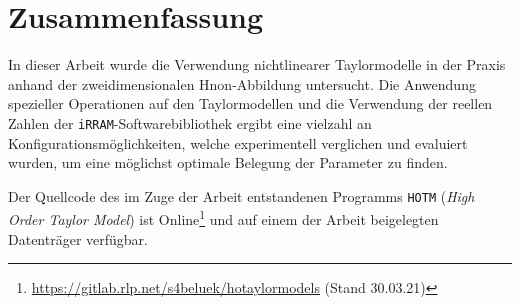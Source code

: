 \chapter*{Zusammenfassung}
In dieser Arbeit wurde die Verwendung nichtlinearer Taylormodelle in der Praxis anhand der zweidimensionalen H\e non-Abbildung untersucht. Die Anwendung spezieller Operationen auf den Taylormodellen und die Verwendung der reellen Zahlen der \verb+iRRAM+-Softwarebibliothek ergibt eine vielzahl an Konfigurationsmöglichkeiten, welche experimentell verglichen und evaluiert wurden, um eine möglichst optimale Belegung der Parameter zu finden.

Der Quellcode des im Zuge der Arbeit entstandenen Programms \verb+HOTM+ (\textit{High Order Taylor Model}) ist Online\footnote{\url{https://gitlab.rlp.net/s4beluek/hotaylormodels} (Stand 30.03.21)} und auf einem der Arbeit beigelegten Datenträger verfügbar.
